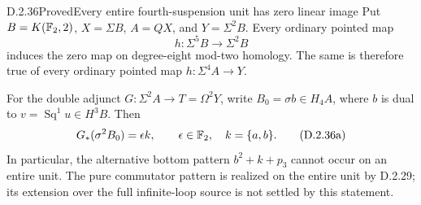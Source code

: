 \begin{claim}{D.2.36}{Proved}{Every entire fourth-suspension unit has zero linear image}
Put $B=K(\mathbb F_2,2)$, $X=\Sigma B$, $A=QX$, and
$Y=\Sigma^2B$. Every ordinary pointed map
\[
             h:\Sigma^5B\longrightarrow\Sigma^2B
\]
induces the zero map on degree-eight mod-two homology.
The same is therefore true of every ordinary pointed map
$h:\Sigma^4A\to Y$.

For the double adjunct $G:\Sigma^2A\to T=\Omega^2Y$,
write $B_0=\sigma b\in H_4A$, where $b$ is dual to
$v=\operatorname{Sq}^1u\in H^3B$. Then
\[
                   G_*(\sigma^2B_0)=\epsilon k,
                   \qquad \epsilon\in\mathbb F_2,
                   \quad k=\{a,b\}.
                   \tag{D.2.36a}
\]
In particular, the alternative bottom pattern
$b^2+k+p_3$ cannot occur on an entire unit. The pure
commutator pattern is realized on the entire unit by D.2.29;
its extension over the full infinite-loop source is not
settled by this statement.
\end{claim}
